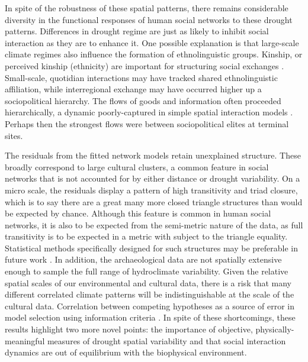 \documentclass[10pt]{iopart}
\begin{document}

In spite of the robustness of these spatial patterns, there remains considerable diversity in the functional responses of human social networks to these drought patterns. Differences in drought regime are just as likely to inhibit social interaction as they are to enhance it. One possible explanation is that large-scale climate regimes also influence the formation of ethnolinguistic groups. Kinship, or perceived kinship (ethnicity) are important for structuring social exchanges \parencite{Nolin2010}. Small-scale, quotidian interactions may have tracked shared ethnolinguistic affiliation, while interregional exchange may have occurred higher up a sociopolitical hierarchy. The flows of goods and information often proceeded hierarchically, a dynamic poorly-captured in simple spatial interaction models \parencite{Crumley1979}. Perhaps then the strongest flows were between sociopolitical elites at terminal sites.
 
The residuals from the fitted network models retain unexplained structure. These broadly correspond to large cultural clusters, a common feature in social networks that is not accounted for by either distance or drought variability. On a micro scale, the residuals display a pattern of high transitivity and triad closure, which is to say there are a great many more closed triangle structures than would be expected by chance. Although this feature is common in human social networks, it is also to be expected from the semi-metric nature of the data, as full transitivity is to be expected in a metric with subject to the triangle equality. Statistical methods specifically designed for such structures may be preferable in future work \parencite{Stillman2017}. In addition, the archaeological data are not spatially extensive enough to sample the full range of hydroclimate variability. Given the relative spatial scales of our environmental and cultural data, there is a risk that many different correlated climate patterns will be indistinguishable at the scale of the cultural data. Correlation between competing hypotheses as a source of error in model selection using information criteria \parencite{Shirk2018}. In spite of these shortcomings, these results highlight two more novel points: the importance of objective, physically-meaningful measures of drought spatial variability and that social interaction dynamics are out of equilibrium with the biophysical environment. 
\end{document}
